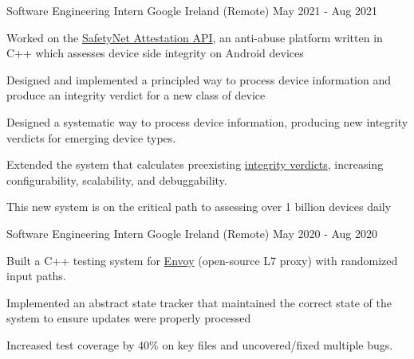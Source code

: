 \begin{cventries}
  \cventry
    {Software Engineering Intern}
    {Google}
    {Ireland (Remote)}
    {May 2021 - Aug 2021}
    {
      \begin{cvitems}
        \item Worked on the \href{https://developer.android.com/training/safetynet/attestation}{SafetyNet Attestation API}, an anti-abuse platform written in C++ which assesses device side integrity on Android devices
        \item Designed and implemented a principled way to process device information and produce an integrity verdict for a new class of device
		\item Designed a systematic way to process device information, producing new integrity verdicts for emerging device types.
        \item Extended the system that calculates preexisting \href{https://developer.android.com/training/safetynet/attestation\#potential-integrity-verdicts}{integrity verdicts}, increasing configurability, scalability, and debuggability.
        \item This new system is on the critical path to assessing over 1 billion devices daily
      \end{cvitems}
    }

  \cventry
    {Software Engineering Intern}
    {Google}
    {Ireland (Remote)}
    {May 2020 - Aug 2020}
    {
      \begin{cvitems}
		\item Built a C++ testing system for \href{https://github.com/envoyproxy/envoy}{Envoy} (open-source L7 proxy) with randomized input paths.
        \item Implemented an abstract state tracker that maintained the correct state of the system to ensure updates were properly processed
		\item Increased test coverage by 40\% on key files and uncovered/fixed multiple bugs.
      \end{cvitems}
    }

\end{cventries}
